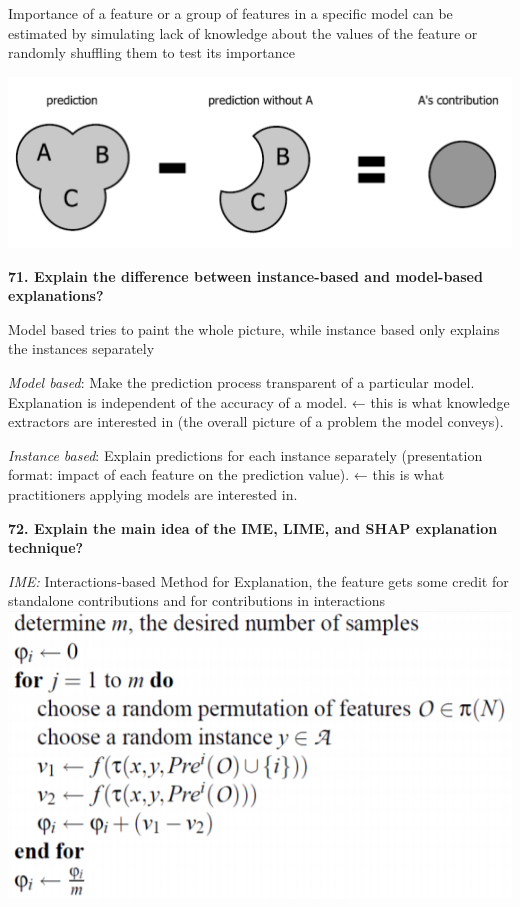 Importance of a feature or a group of features in a specific model can
be estimated by simulating lack of knowledge about the values of the
feature or randomly shuffling them to test its importance

\includegraphics[width=\columnwidth]{media/image6.png}

\textbf{71. Explain the difference between instance-based and
model-based explanations?}

Model based tries to paint the whole picture, while instance based only
explains the instances separately

\textit{Model based}: Make the prediction process transparent of a
particular model. Explanation is independent of the accuracy of a model.
← this is what knowledge extractors are interested in (the overall
picture of a problem the model conveys).

\textit{Instance based}: Explain predictions for each instance
separately (presentation format: impact of each feature on the
prediction value). ← this is what practitioners applying models are
interested in.

\textbf{72. Explain the main idea of the IME, LIME, and SHAP explanation
technique?}

\textit{IME:} Interactions-based Method for Explanation, the feature
gets some credit for standalone contributions and for contributions in
interactions
\includegraphics[width=\columnwidth]{media/image21.png}

